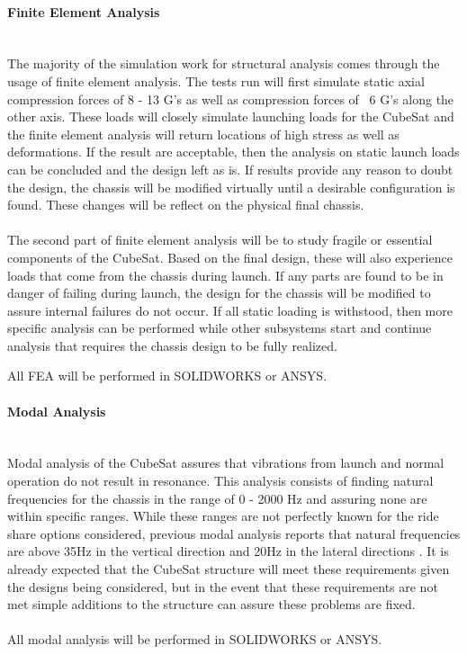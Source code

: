 \paragraph{Finite Element Analysis} ~\\

The majority of the simulation work for structural analysis comes through the usage of finite element analysis. The tests run will first simulate static axial compression forces of 8 - 13 G's as well as compression forces of ~6 G's along the other axis. These loads will closely simulate launching loads for the CubeSat and the finite element analysis will return locations of high stress as well as deformations. If the result are acceptable, then the analysis on static launch loads can be concluded and the design left as is. If results provide any reason to doubt the design, the chassis will be modified virtually until a desirable configuration is found. These changes will be reflect on the physical final chassis.
\\
\\
The second part of finite element analysis will be to study fragile or essential components of the CubeSat. Based on the final design, these will also experience loads that come from the chassis during launch. If any parts are found to be in danger of failing during launch, the design for the chassis will be modified to assure internal failures do not occur. If all static loading is withstood, then more specific analysis can be performed while other subsystems start and continue analysis that requires the chassis design to be fully realized.

All FEA will be performed in SOLIDWORKS or ANSYS.
\paragraph{Modal Analysis} ~\\

Modal analysis of the CubeSat assures that vibrations from launch and normal operation do not result in resonance. This analysis consists of finding natural frequencies for the chassis in the range of 0 - 2000 Hz and assuring none are within specific ranges. While these ranges are not perfectly known for the ride share options considered, previous modal analysis reports that natural frequencies are above 35Hz in the vertical direction and 20Hz in the lateral directions \cite{FEA1, FEA5, FEA7}. It is already expected that the CubeSat structure will meet these requirements given the designs being considered, but in the event that these requirements are not met simple additions to the structure can assure these problems are fixed.
~\\~\\
All modal analysis will be performed in SOLIDWORKS or ANSYS.
